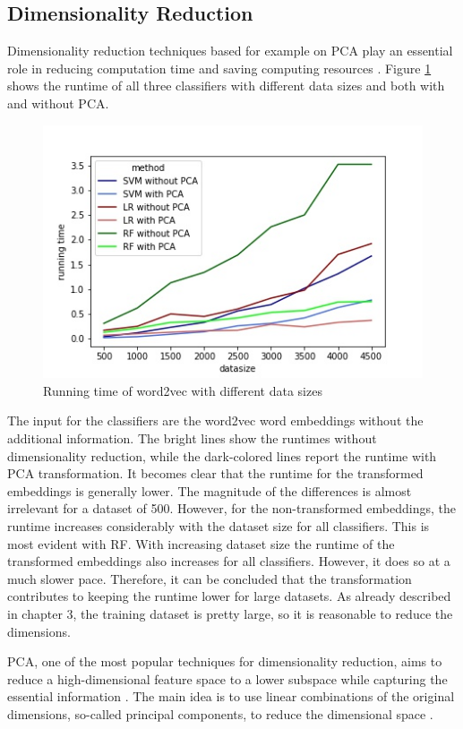 \documentclass[12pt, a4paper, titlepage]{article}
\begin{document}
\subsection{Dimensionality Reduction}
Dimensionality reduction techniques based for example on \ac{PCA} play an essential role in reducing computation time and saving computing resources \citep{ayesha2020}. Figure \ref{fig: F6} shows the runtime of all three classifiers with different data sizes and both with and without \ac{PCA}. 


\begin{figure}[hb!]
  \center
  \includegraphics[scale=0.5]{running_time_PCA.jpeg}
  \caption{\label{fig: F6} Running time of word2vec with different data sizes}
\end{figure}

The input for the classifiers are the word2vec word embeddings without the additional information. The bright lines show the runtimes without dimensionality reduction, while the dark-colored lines report the runtime with \ac{PCA} transformation. It becomes clear that the runtime for the transformed embeddings is generally lower. The magnitude of the differences is almost irrelevant for a dataset of 500. However, for the non-transformed embeddings, the runtime increases considerably with the dataset size for all classifiers. This is most evident with \ac{RF}. With increasing dataset size the runtime of the transformed embeddings also increases for all classifiers. However, it does so at a much slower pace. Therefore, it can be concluded that the transformation contributes to keeping the runtime lower for large datasets. As already described in chapter 3, the training dataset is pretty large, so it is reasonable to reduce the dimensions. 

\ac{PCA}, one of the most popular techniques for dimensionality reduction, aims to reduce a high-dimensional feature space to a lower subspace while capturing the essential information \citep{tipping1999, bisong2019}. The main idea is to use linear combinations of the original dimensions, so-called principal components, to reduce the dimensional space \citep{bro2014,geladi2017}.
\end{document}
